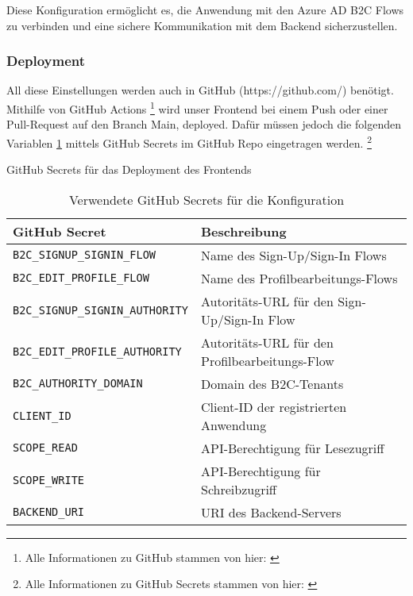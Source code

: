 Diese Konfiguration ermöglicht es, die Anwendung mit den Azure AD B2C 
Flows zu verbinden und eine sichere Kommunikation mit dem Backend sicherzustellen.

\subsubsection{Deployment}

All diese Einstellungen werden auch in GitHub (https://github.com/) benötigt.
Mithilfe von GitHub Actions \footnote{Alle Informationen zu GitHub stammen von hier: \cite{GitHuba}}
wird unser Frontend bei einem Push oder einer Pull-Request auf den Branch Main, deployed.
Dafür müssen jedoch die folgenden Variablen \ref{tab:github-secrets} mittels GitHub Secrets im GitHub Repo eingetragen werden.
\footnote{Alle Informationen zu GitHub Secrets stammen von hier: \cite{GitHub}}

\begin{table}[h t]
    \centering
    \caption{GitHub Secrets für das Deployment des Frontends}
    \label{tab:github-secrets}
    \begin{tabular}{|l|l|}
    \hline
    \textbf{GitHub Secret}              & \textbf{Beschreibung} \\ \hline
    \texttt{B2C\_SIGNUP\_SIGNIN\_FLOW}   & Name des Sign-Up/Sign-In Flows \\ \hline
    \texttt{B2C\_EDIT\_PROFILE\_FLOW}    & Name des Profilbearbeitungs-Flows \\ \hline
    \texttt{B2C\_SIGNUP\_SIGNIN\_AUTHORITY} & Autoritäts-URL für den Sign-Up/Sign-In Flow \\ \hline
    \texttt{B2C\_EDIT\_PROFILE\_AUTHORITY}  & Autoritäts-URL für den Profilbearbeitungs-Flow \\ \hline
    \texttt{B2C\_AUTHORITY\_DOMAIN}      & Domain des B2C-Tenants \\ \hline
    \texttt{CLIENT\_ID}                  & Client-ID der registrierten Anwendung \\ \hline
    \texttt{SCOPE\_READ}                 & API-Berechtigung für Lesezugriff \\ \hline
    \texttt{SCOPE\_WRITE}                & API-Berechtigung für Schreibzugriff \\ \hline
    \texttt{BACKEND\_URI}                & URI des Backend-Servers \\ \hline
    \end{tabular}
    \caption{Verwendete GitHub Secrets für die Konfiguration}
\end{table}


